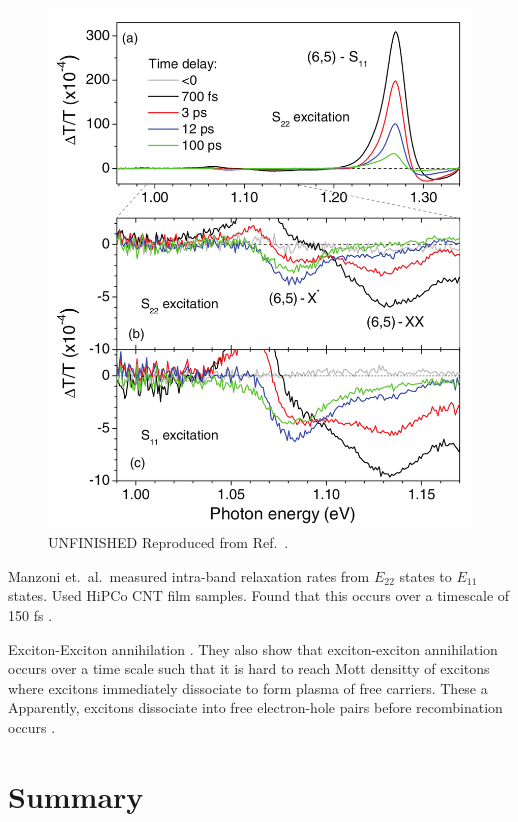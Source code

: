 \begin{figure}[h]
	\centering
	\includegraphics[scale=0.3]{images/chapter_prior_works/dtt_yuma}
	\caption{{\color{red} UNFINISHED} Reproduced from Ref.\ \cite{yuma2013biexciton}.}
\end{figure}

Manzoni et.\ al.\ measured intra-band relaxation rates from $E_{22}$ states to $E_{11}$ states. Used HiPCo CNT film samples.  Found that this occurs over a timescale of 150 fs \cite{manzoni2005intersubband}.

Exciton-Exciton annihilation \cite{valkunas2006exciton, yuma2013biexciton}.
They also show that exciton-exciton annihilation occurs over a time scale such that it is hard to reach Mott densitty of excitons where excitons immediately dissociate to form plasma of free carriers. These a
Apparently, excitons dissociate into free electron-hole pairs before recombination occurs \cite{kumamoto2014spontaneous}.




\section{Summary}
